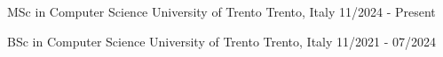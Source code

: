 

\begin{cventries}

	\cventry
	{MSc in Computer Science} %
	{University of Trento} %
	{Trento, Italy} %
	{11/2024 - Present} %
	{}

	\cventry
	{BSc in Computer Science} %
	{University of Trento} %
	{Trento, Italy} %
	{11/2021 - 07/2024} %
	{}

\end{cventries}
